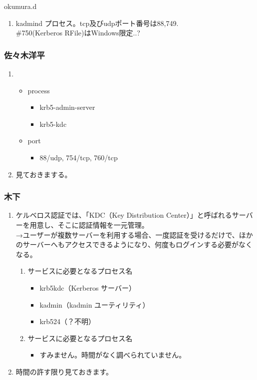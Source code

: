 \documentclass[cjk,dvipdfmx,10pt,%
hyperref={bookmarks=true,bookmarksnumbered=true,bookmarksopen=false,%
colorlinks=false,%
pdftitle={第 63 回 関西 Debian 勉強会},%
pdfauthor={倉敷・のがた・かわだ・佐々木},%
pdfsubject={資料},%
}]{beamer}
\begin{document}
\begin{frame}{ okumura.d }
  \begin{enumerate}
  \item kadmind プロセス。tcp及びudpポート番号は88,749.\\
    \#750(Kerberos RFile)はWindows限定..?
  \end{enumerate}
\end{frame}

\begin{frame}
  \frametitle{ 佐々木洋平 }
  \begin{enumerate}
  \item 
    \begin{itemize}
    \item process
      \begin{itemize}
      \item krb5-admin-server
      \item krb5-kdc
      \end{itemize}
    \item port
      \begin{itemize}
      \item 88/udp, 754/tcp, 760/tcp
      \end{itemize}
    \end{itemize}
  \item 見ておきまする。 
  \end{enumerate}
\end{frame}

\begin{frame}
  \frametitle{ 木下 }
  \begin{enumerate}
  \item ケルベロス認証では、「KDC（Key Distribution Center）」と呼ばれるサーバーを用意し、そこに認証情報を一元管理。\\
    →ユーザーが複数サーバーを利用する場合、一度認証を受けるだけで、ほかのサーバーへもアクセスできるようになり、何度もログインする必要がなくなる。
    \begin{enumerate}
    \item サービスに必要となるプロセス名
      \begin{itemize}
      \item krb5kdc（Kerberos サーバー）
      \item kadmin（kadmin ユーティリティ）
      \item krb524（？不明）
      \end{itemize}
    \item サービスに必要となるプロセス名
      \begin{itemize}
      \item すみません。時間がなく調べられていません。
      \end{itemize}
    \end{enumerate}
  \item 時間の許す限り見ておきます。
  \end{enumerate}
\end{frame}
\end{document}
